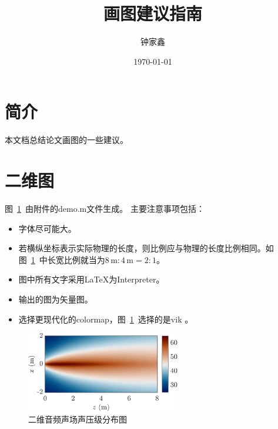\documentclass{article}
\title{\textbf{画图建议指南}}
\author{钟家鑫}
\date{\today}
\begin{document}
\maketitle
\thispagestyle{firststyle}

\section{简介}
本文档总结论文画图的一些建议。

\section{二维图}
图~\ref{fig:2d_fig}~由附件的demo.m文件生成。
主要注意事项包括：
\begin{itemize}
    \item 字体尽可能大。
    \item 若横纵坐标表示实际物理的长度，则比例应与物理的长度比例相同。如图~\ref{fig:2d_fig}~中长宽比例就当为$8\,\text{m} : 4\, \text{m} = 2:1$。
    \item 图中所有文字采用LaTeX为Interpreter。
    \item 输出的图为矢量图。
    \item 选择更现代化的colormap，图~\ref{fig:2d_fig}~选择的是vik \cite{Crameri2020MisuseColourScience}。
\end{itemize}
\begin{figure}[!htb]
    \centering
    \includegraphics[width = 0.6\textwidth]{fig.pdf}
    \caption{二维音频声场声压级分布图}
    \label{fig:2d_fig}
\end{figure}



\printbibliography[title=参考文献]
\end{document}
